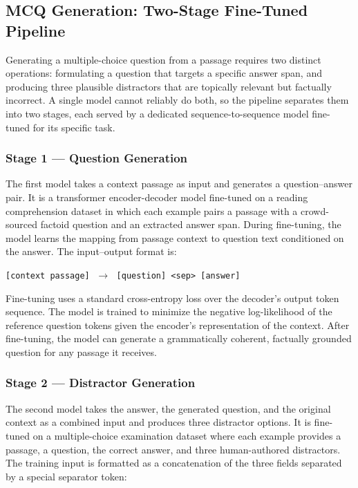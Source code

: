 \subsection{MCQ Generation: Two-Stage Fine-Tuned Pipeline}

Generating a multiple-choice question from a passage requires two distinct operations: formulating a question that targets a specific answer span, and producing three plausible distractors that are topically relevant but factually incorrect. A single model cannot reliably do both, so the pipeline separates them into two stages, each served by a dedicated sequence-to-sequence model fine-tuned for its specific task.

\subsubsection{Stage 1 — Question Generation}

The first model takes a context passage as input and generates a question–answer pair. It is a transformer encoder-decoder model fine-tuned on a reading comprehension dataset in which each example pairs a passage with a crowd-sourced factoid question and an extracted answer span. During fine-tuning, the model learns the mapping from passage context to question text conditioned on the answer. The input–output format is:

\begin{center}
\texttt{[context passage]} $\;\longrightarrow\;$ \texttt{[question] \textless sep\textgreater\ [answer]}
\end{center}

Fine-tuning uses a standard cross-entropy loss over the decoder's output token sequence. The model is trained to minimize the negative log-likelihood of the reference question tokens given the encoder's representation of the context. After fine-tuning, the model can generate a grammatically coherent, factually grounded question for any passage it receives.

\subsubsection{Stage 2 — Distractor Generation}

The second model takes the answer, the generated question, and the original context as a combined input and produces three distractor options. It is fine-tuned on a multiple-choice examination dataset where each example provides a passage, a question, the correct answer, and three human-authored distractors. The training input is formatted as a concatenation of the three fields separated by a special separator token:

